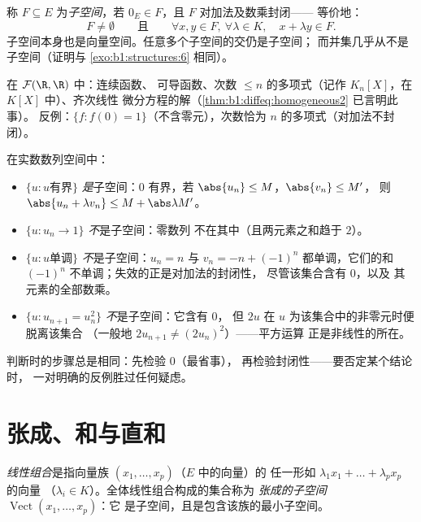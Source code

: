 \begin{definition}[子空间]\label{def:b1:vspaces:subspace}
称 $F \subseteq E$ 为\emph{子空间}，若 $0_E \in
F$，且 $F$ 对加法及数乘封闭——
等价地：
\[
F \neq \emptyset
\qquad\text{且}\qquad
\forall x, y \in F,\ \forall \lambda \in K,\quad
x + \lambda y \in F .
\]
子空间本身也是向量空间。任意多个子空间的交仍是子空间；
而并集几乎从不是子空间（证明与
\cref{exo:b1:structures:6} 相同）。
\end{definition}

\begin{example}\label{ex:b1:vspaces:subspaces}
在 $\mathcal{F}(\R, \R)$ 中：连续函数、
可导函数、次数 $\leq n$ 的多项式（记作
$K_n[X]$，在 $K[X]$ 中）、齐次线性
微分方程的解（\cref{thm:b1:diffeq:homogeneous2} 已言明此事）。
反例：$\{f : f(0) = 1\}$（不含零元），次数恰为
$n$ 的多项式（对加法不封闭）。
\end{example}

\begin{example}
\label{ex:b1:vspaces:subspaceornot}
在实数数列空间中：
\begin{itemize}
  \item $\{u : u \text{有界}\}$ \emph{是}子空间：$0$
        有界，若 $\abs{u_n} \leq M$，$\abs{v_n} \leq M'$，
        则 $\abs{u_n + \lambda v_n} \leq M + \abs\lambda M'$。
  \item $\{u : u_n \to 1\}$ \emph{不}是子空间：零数列
        不在其中（且两元素之和趋于 $2$）。
  \item $\{u : u \text{单调}\}$ \emph{不}是子空间：$u_n = n$
        与 $v_n = -n + (-1)^n$ 都单调，它们的和
        $(-1)^n$ 不单调；失效的正是对加法的封闭性，
        尽管该集合含有 $0$，以及
        其元素的全部数乘。
  \item $\{u : u_{n+1} = u_n^2\}$ \emph{不}是子空间：它含有 $0$，
        但 $2u$ 在 $u$ 为该集合中的非零元时便脱离该集合
        （一般地 $2u_{n+1} \neq (2u_n)^2$）——平方运算
        正是非线性的所在。
\end{itemize}
判断时的步骤总是相同：先检验 $0$（最省事），
再检验封闭性——要否定某个结论时，
一对明确的反例胜过任何疑虑。
\end{example}

\section{张成、和与直和}

\begin{definition}\label{def:b1:vspaces:span}
\emph{线性组合}是指向量族 $(x_1, \dots, x_p)$（$E$ 中的向量）的
任一形如 $\lambda_1 x_1 + \dots + \lambda_p x_p$ 的向量
（$\lambda_i \in K$）。全体线性组合构成的集合称为
\emph{张成的子空间} $\operatorname{Vect}(x_1, \dots, x_p)$：它
是子空间，且是包含该族的最小子空间。
\end{definition}


